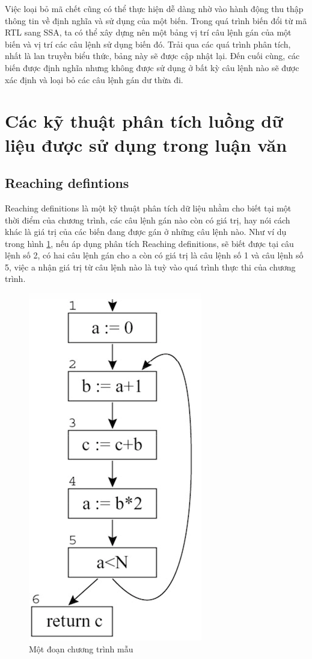 Việc loại bỏ mã chết cũng có thể thực hiện dễ dàng nhờ vào hành động thu thập thông tin về định nghĩa và sử dụng của một biến. Trong quá trình biến đổi từ mã RTL sang SSA, ta có thể xây dựng nên một bảng vị trí câu lệnh gán của một biến và vị trí các câu lệnh sử dụng biến đó. Trải qua các quá trình phân tích, nhất là lan truyền biểu thức, bảng này sẽ được cập nhật lại. Đến cuối cùng, các biến được định nghĩa nhưng không được sử dụng ở bất kỳ câu lệnh nào sẽ được xác định và loại bỏ các câu lệnh gán dư thừa đi.\\
\section{Các kỹ thuật phân tích luồng dữ liệu được sử dụng trong luận văn}
\subsection{Reaching defintions}
\label{sec:reachdef}
Reaching definitions \cite{reachingdef} là một kỹ thuật phân tích dữ liệu nhằm cho biết tại một thời điểm của chương trình, các câu lệnh gán nào còn có giá trị, hay nói cách khác là giá trị của các biến đang được gán ở những câu lệnh nào. Như ví dụ trong hình \ref{fig:reachingdefexam}, nếu áp dụng phân tích Reaching definitions, sẽ biết được tại câu lệnh số 2, có hai câu lệnh gán cho a còn có giá trị là câu lệnh số 1 và câu lệnh số 5, việc a nhận giá trị từ câu lệnh nào là tuỳ vào quá trình thực thi của chương trình.
\begin{figure}[h!]
	\centering
	\includegraphics[scale=0.75]{image/reachingDefExam}
	\caption{Một đoạn chương trình mẫu}
	\label{fig:reachingdefexam}
\end{figure}

